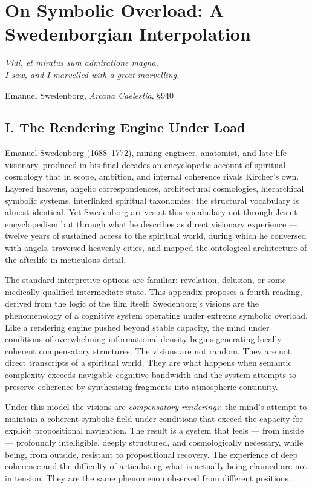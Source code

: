 \documentclass[12pt, a4paper, twoside]{memoir}
\theoremstyle{definition}
\theoremstyle{remark}
\begin{document}
\chapter{On Symbolic Overload: A Swedenborgian Interpolation}

\epigraph{\itshape \textit{Vidi, et miratus sum admiratione magna.}\\
I saw, and I marvelled with a great marvelling.}{Emanuel Swedenborg, \textit{Arcana Caelestia}, \S 940}

\section*{I. The Rendering Engine Under Load}

Emanuel Swedenborg (1688--1772), mining engineer, anatomist, and late-life visionary, produced in his final decades an encyclopedic account of spiritual cosmology that in scope, ambition, and internal coherence rivals Kircher's own. Layered heavens, angelic correspondences, architectural cosmologies, hierarchical symbolic systems, interlinked spiritual taxonomies: the structural vocabulary is almost identical. Yet Swedenborg arrives at this vocabulary not through Jesuit encyclopedism but through what he describes as direct visionary experience --- twelve years of sustained access to the spiritual world, during which he conversed with angels, traversed heavenly cities, and mapped the ontological architecture of the afterlife in meticulous detail.

The standard interpretive options are familiar: revelation, delusion, or some medically qualified intermediate state. This appendix proposes a fourth reading, derived from the logic of the film itself: Swedenborg's visions are the phenomenology of a cognitive system operating under extreme symbolic overload. Like a rendering engine pushed beyond stable capacity, the mind under conditions of overwhelming informational density begins generating locally coherent compensatory structures. The visions are not random. They are not direct transcripts of a spiritual world. They are what happens when semantic complexity exceeds navigable cognitive bandwidth and the system attempts to preserve coherence by synthesising fragments into atmospheric continuity.

Under this model the visions are \textit{compensatory renderings}: the mind's attempt to maintain a coherent symbolic field under conditions that exceed the capacity for explicit propositional navigation. The result is a system that feels --- from inside --- profoundly intelligible, deeply structured, and cosmologically necessary, while being, from outside, resistant to propositional recovery. The experience of deep coherence and the difficulty of articulating what is actually being claimed are not in tension. They are the same phenomenon observed from different positions.
\end{document}
